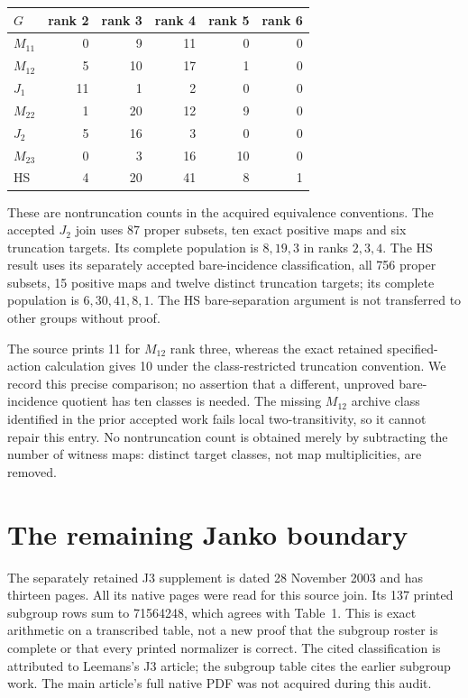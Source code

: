 \documentclass[11pt]{article}
\begin{document}
\begin{center}\small
\begin{tabular}{lrrrrr}\toprule
$G$&rank 2&rank 3&rank 4&rank 5&rank 6\\\midrule
$M_{11}$&0&9&11&0&0\\
$M_{12}$&5&10&17&1&0\\
$J_1$&11&1&2&0&0\\
$M_{22}$&1&20&12&9&0\\
$J_2$&5&16&3&0&0\\
$M_{23}$&0&3&16&10&0\\
HS&4&20&41&8&1\\\bottomrule
\end{tabular}
\end{center}
\noindent These are nontruncation counts in the acquired equivalence
conventions. The accepted $J_2$ join uses 87 proper subsets, ten exact
positive maps and six truncation targets. Its complete population is
$8,19,3$ in ranks $2,3,4$. The HS result uses its separately accepted
bare-incidence classification, all 756 proper subsets, 15 positive maps
and twelve distinct truncation targets; its complete population is
$6,30,41,8,1$. The HS bare-separation argument is not transferred to
other groups without proof.

The source prints 11 for $M_{12}$ rank three, whereas the exact retained
specified-action calculation gives 10 under the class-restricted
truncation convention. We record this precise comparison; no assertion
that a different, unproved bare-incidence quotient has ten classes is
needed. The missing $M_{12}$ archive class identified in the prior
accepted work fails local two-transitivity, so it cannot repair this
entry. No nontruncation count is obtained merely by subtracting the
number of witness maps: distinct target classes, not map multiplicities,
are removed.

\section{The remaining Janko boundary}
The separately retained J3 supplement is dated 28 November 2003 and has
thirteen pages. All its native pages were read for this source join.
Its 137 printed subgroup rows sum to 71564248, which agrees with Table~1.
This is exact arithmetic on a transcribed table, not a new proof that
the subgroup roster is complete or that every printed normalizer is
correct. The cited classification is attributed to Leemans's J3 article;
the subgroup table cites the earlier subgroup work. The main article's
full native PDF was not acquired during this audit.
\end{document}
